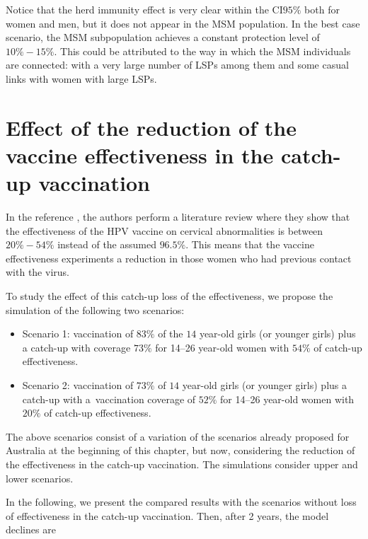 Notice that the herd immunity effect is very clear within the CI$95\%$ both for women and men, but it does not appear in the MSM population. In the best case scenario, the MSM subpopulation achieves a constant protection level of $10\%-15\%$. This could be attributed to the way in which the MSM individuals are connected: with a very large number of LSPs among them and some casual links with women with large LSPs.

\section{Effect of the reduction of the vaccine effectiveness in the catch-up vaccination}\label{sec:australia_sfuka}
In the reference \cite{Skufca}, the authors perform a literature review where they show that the effectiveness of the HPV vaccine on cervical abnormalities is between $20\%-54\%$ instead of the assumed $96.5\%$. This means that the vaccine effectiveness experiments a reduction in those women who had previous contact with the virus.

To study the effect of this catch-up loss of the effectiveness, we propose the simulation of the following two scenarios: 

\begin{itemize}
	\item Scenario 1: vaccination of $83\%$ of the $14$ year-old girls (or younger girls) plus a catch-up with coverage $73\%$ for 14--26 year-old women with $54\%$ of catch-up effectiveness.
	\item Scenario 2: vaccination of $73\%$ of $14$ year-old girls (or younger girls) plus a catch-up with a~vaccination coverage of $52\%$ for 14--26 year-old women with $20\%$ of catch-up effectiveness.
\end{itemize}

The above scenarios consist of a variation of the scenarios already proposed  for Australia at the beginning of this chapter, but now, considering the reduction of the effectiveness in the catch-up vaccination. The simulations consider upper and lower scenarios. 

In the following, we present the compared results with the scenarios without loss of effectiveness in the catch-up vaccination. Then, after 2 years, the model declines are

